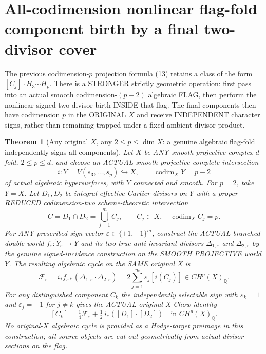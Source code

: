 \documentclass[11pt]{article}
\newtheorem{theorem}{Theorem}
\begin{document}
\section{All-codimension nonlinear flag-fold component birth by a final two-divisor cover}
The previous codimension-$p$ projection formula (13)
retains a class of the form $[C_j]\cdot H_3\cdots H_p$.
There is a STRONGER strictly geometric operation:
first pass into an actual smooth codimension-$(p-2)$
algebraic FLAG, then perform the nonlinear signed
two-divisor birth INSIDE that flag. The final components
then have codimension $p$ in the ORIGINAL $X$ and
receive INDEPENDENT character signs, rather than
remaining trapped under a fixed ambient divisor product.

\begin{theorem}[Any original $X$, any $2\le p\le\dim X$:
a genuine algebraic flag-fold independently signs all components]
Let $X$ be ANY smooth projective complex
$d$-fold, $2\le p\le d$, and choose an
ACTUAL smooth projective complete intersection
\[
  i:Y=V(s_3,\ldots,s_p)\hookrightarrow X,
  \qquad \operatorname{codim}_X Y=p-2
\]
of actual algebraic hypersurfaces, with
$Y$ connected and smooth.
For $p=2$, take $Y=X$.
Let $D_1,D_2$ be integral effective Cartier
divisors on $Y$ with a proper REDUCED
codimension-two scheme-theoretic intersection
\[
 C=D_1\cap D_2=\bigcup_{j=1}^{m}C_j,
 \qquad C_j\subset X,\quad
 \operatorname{codim}_X C_j=p .
\]
For ANY prescribed sign vector
$\varepsilon\in\{+1,-1\}^{m}$, construct the
ACTUAL branched double-world
$f_\varepsilon:\widetilde Y_\varepsilon\to Y$
and its two true anti-invariant divisors
$\Delta_{1,\varepsilon}$ and
$\Delta_{2,\varepsilon}$ by the genuine
signed-incidence construction on the
SMOOTH PROJECTIVE world $Y$.
The resulting algebraic cycle on the SAME
original X is
\[
 \boxed{
 \mathcal F_\varepsilon=
 i_* f_{\varepsilon*}
       (\Delta_{1,\varepsilon}\cdot
        \Delta_{2,\varepsilon})
       =2\sum_{j=1}^{m}
          \varepsilon_j[i(C_j)]
       \in CH^p(X)_{\mathbb Q}.
 }                                                     \tag{17}
\]
For any distinguished component $C_k$ the
independently selectable sign with $\varepsilon_k=1$
and $\varepsilon_j=-1$ for $j\ne k$ gives
the ACTUAL original-X Chow identity
\[
 \boxed{
 [C_k]=\tfrac14\mathcal F_{\varepsilon}
              +\tfrac12\,i_*([D_1]\cdot[D_2])
       \quad\text{in }CH^p(X)_{\mathbb Q}.
 }                                                     \tag{18}
\]
No original-$X$ algebraic cycle is provided as a
Hodge-target preimage in this construction;
all source objects are cut out geometrically
from actual divisor sections on the flag.


\end{theorem}
\end{document}
